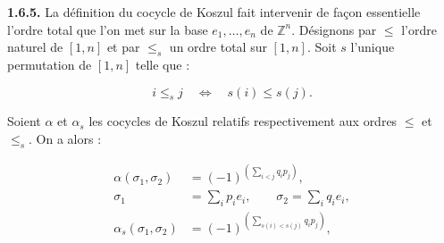 \noindent\textbf{1.6.5.}\quad
La définition du cocycle de Koszul fait intervenir de façon essentielle
l'ordre total que l'on met sur la base $e_1,\ldots,e_n$ de
$\mathbb Z^n$. Désignons par $\leq$ l'ordre naturel de $[1,n]$ et par
$\leq_s$ un ordre total sur $[1,n]$. Soit $s$ l'unique permutation de
$[1,n]$ telle que :

\begin{equation}
  i\leq_s j\quad\Longleftrightarrow\quad s(i)\leq s(j).
  \tag{1.6.5.1}
\end{equation}

Soient $\alpha$ et $\alpha_s$ les cocycles de Koszul relatifs
respectivement aux ordres $\leq$ et $\leq_s$. On a alors :

\begin{equation}
  \begin{aligned}
    \alpha(\sigma_1,\sigma_2)
      &=(-1)^{\left(\sum_{i<j}q_i p_j\right)},\\
    \sigma_1&=\sum_i p_i e_i,
      \qquad \sigma_2=\sum_i q_i e_i,\\
    \alpha_s(\sigma_1,\sigma_2)
      &=(-1)^{\left(\sum_{s(i)<s(j)}q_i p_j\right)},
  \end{aligned}
  \tag{1.6.5.2}
\end{equation}
